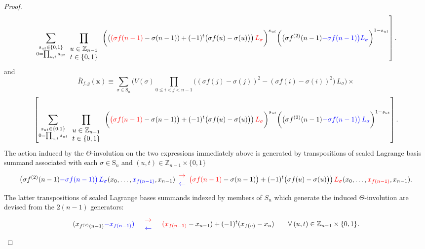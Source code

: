 \begin{proof}
\[\]
\[
\left.\sum_{\substack{s_{ut}\in\{0,1\}\\
0=\prod_{u,t}s_{ut}
}
}\prod_{\begin{array}{c}
u\in\mathbb{Z}_{n-1}\\
t\in\{0,1\}
\end{array}}\bigg(\big({\color{red}(\sigma f(n-1)}-\sigma(n-1))+(-1)^{t}\big(\sigma f(u)-\sigma(u)\big)\big)\,{\color{red}L_{\sigma}}\bigg)^{s_{ut}}\bigg(\big(\sigma f^{(2)}(n-1){\color{blue}-\sigma f(n-1)}{\color{blue}\big)}{\color{blue}L_{\sigma}}\bigg)^{1-s_{ut}}\right].
\]
and
\[
\overline{R}_{f,g}(\mathbf{x})\equiv\sum_{\sigma\in\text{S}_{n}}\bigg(V(\sigma)\prod_{0\le i<j<n-1}\big((\sigma f(j)-\sigma(j))^{2}-(\sigma f(i)-\sigma(i))^{2}\big)\,L_{\sigma}\bigg)\times
\]
\[
\left[\sum_{\substack{s_{ut}\in\{0,1\}\\
0=\prod_{u,t}s_{ut}
}
}\prod_{\begin{array}{c}
u\in\mathbb{Z}_{n-1}\\
t\in\{0,1\}
\end{array}}\bigg({\color{red}\big(}{\color{red}\sigma f(n-1)}-\sigma(n-1)\big)+(-1)^{t}\big(\sigma f(u)-\sigma(u)\big)\big)\,{\color{red}L_{\sigma}}\bigg)^{s_{ut}}\bigg(\big(\sigma f^{(2)}(n-1){\color{blue}-\sigma f(n-1)}{\color{blue}\big)}\,{\color{blue}L_{\sigma}}\bigg)^{1-s_{ut}}\right].
\]
The action induced by the $\Theta$-involution on the two expressions immediately above is generated by transpositions of scaled Lagrange basis summand associated with each $\sigma\in\text{S}_{n}$ and $(u,t)\in\mathbb{Z}_{n-1}\times\{0,1\}$
\[
\big(\sigma f^{(2)}(n-1){\color{blue}-\sigma f(n-1)}{\color{blue}\big)}\,{\color{blue}L_{\sigma}}(x_{0},\ldots,{\color{blue}x_{f(n-1)}},x_{n-1})\begin{array}{c}
{\color{red}\rightarrow}\\
{\color{blue}\leftarrow}
\end{array}{\color{red}\big(}{\color{red}\sigma f(n-1)}-\sigma(n-1)\big)+(-1)^{t}\big(\sigma f(u)-\sigma(u)\big)\big)\,{\color{red}L_{\sigma}}(x_{0},\ldots,{\color{red}x_{f(n-1)}},x_{n-1}).
\]
The latter transpositions of scaled Lagrange bases summands indexed by members of $S_{n}$ which generate the induced $\Theta$-involution are devised from the $2(n-1)$ generators:
\[
\begin{array}{ccccc}
(x_{f^{(2)}(n-1)}{\color{blue}-x_{f(n-1)}}{\color{blue})} & \begin{array}{c}
{\color{red}\rightarrow}\\
{\color{blue}\leftarrow}
\end{array} & {\color{red}(x_{f(n-1)}}-x_{n-1})+(-1)^{t}(x_{f(u)}-x_{u}) &  & \forall\:(u,t)\in\mathbb{Z}_{n-1}\times\{0,1\}.\end{array}
\]
\end{proof}
